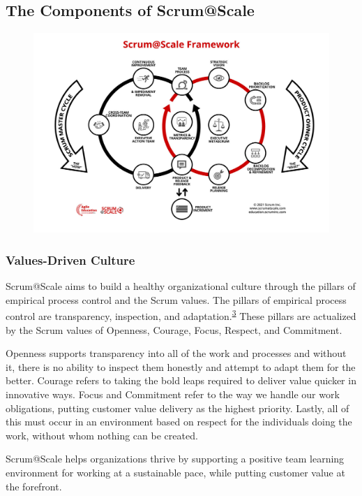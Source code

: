 \documentclass[12pt,a4paper,parskip=full]{scrartcl}
\begin{document}
\subsection{The Components of
Scrum@Scale}\label{the-components-of-scrumatscale}
\begin{figure}
    \centering
    \includegraphics[scale=0.25]{SMPO-Cycle.png}
\end{figure}


\subsubsection{Values-Driven Culture}\label{values-driven-culture}

Scrum@Scale aims to build a healthy organizational culture through the
pillars of empirical process control and the Scrum values. The pillars
of empirical process control are transparency, inspection, and
adaptation.\textsuperscript{\hyperref[citation3]{3}} These pillars are
actualized by the Scrum values of Openness, Courage, Focus, Respect, and
Commitment.

Openness supports transparency into all of the work and processes and
without it, there is no ability to inspect them honestly and attempt to
adapt them for the better. Courage refers to taking the bold leaps
required to deliver value quicker in innovative ways. Focus and
Commitment refer to the way we handle our work obligations, putting
customer value delivery as the highest priority. Lastly, all of this
must occur in an environment based on respect for the individuals doing
the work, without whom nothing can be created.

Scrum@Scale helps organizations thrive by supporting a positive team
learning environment for working at a sustainable pace, while putting
customer value at the forefront.
\end{document}
